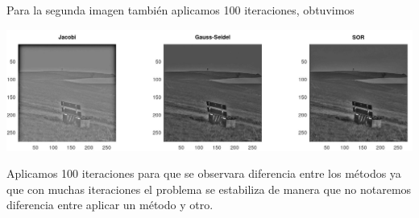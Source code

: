     Para la segunda imagen también aplicamos 100 iteraciones, obtuvimos 

    \begin{center}
        \includegraphics[scale=0.27]{Graficas/Bordes2.jpg}
    \end{center}

    Aplicamos 100 iteraciones para que se observara diferencia entre los métodos ya que con muchas iteraciones el problema se estabiliza de manera que no notaremos diferencia entre aplicar un método y otro.